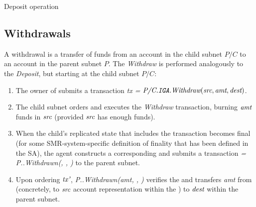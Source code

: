  

\begin{algorithm}[H]
\footnotesize
\caption{Deposit operation}\label{alg:deposit}
  \DontPrintSemicolon

\end{algorithm}

\subsection{Withdrawals}
\label{sec:withdraw}

A withdrawal is a transfer of funds from an account \src in the child subnet $P/C$ to an account \dest in the parent subnet $P$.
The \emph{Withdraw} is performed analogously to the \emph{Deposit}, but starting at the child subnet $P/C$:
\begin{enumerate}
  \item The owner of \src submits a transaction \emph{tx =} $\textit{P/C.\texttt{IGA}.Withdraw}(\textit{src}, \textit{amt}, \textit{dest})$.
    \item The child subnet orders and executes the \emph{Withdraw} transaction, burning $\textit{amt}$ funds in $\textit{src}$ (provided $\textit{src}$ has enough funds).
    \item When the child's replicated state that includes the transaction becomes final (for some SMR-system-specific definition of finality that has been defined in the SA), the \ipc agent constructs a corresponding \pof and submits a transaction \textit{ = P.\sa.Withdrawn(\fil, \dest, \pof)} to the parent subnet.
    \item Upon ordering $\textit{tx'}$, \emph{P.\sa.Withdrawn(amt, \dest, \pof)} verifies the \pof and transfers \emph{amt} from \sa (concretely, to $\textit{src}$ account representation within the \sa) to $\textit{dest}$ within the parent subnet.
\end{enumerate}

